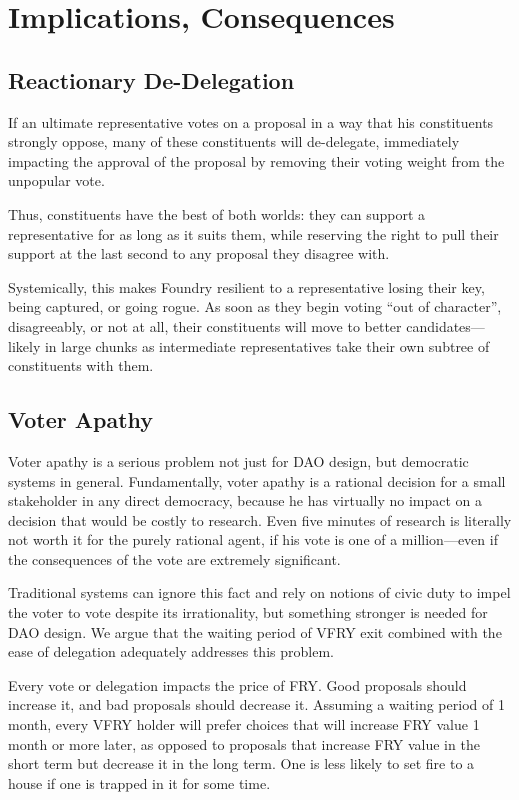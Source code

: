 \section{Implications, Consequences} \label{implications}

\subsection{Reactionary De-Delegation} \label{reactionary-dedelegation}

If an ultimate representative votes on a proposal in a way that his constituents strongly oppose, many of these constituents will de-delegate, immediately impacting the approval of the proposal by removing their voting weight from the unpopular vote.

Thus, constituents have the best of both worlds: they can support a representative for as long as it suits them, while reserving the right to pull their support at the last second to any proposal they disagree with.

Systemically, this makes Foundry resilient to a representative losing their key, being captured, or going rogue. As soon as they begin voting ``out of character'', disagreeably, or not at all, their constituents will move to better candidates---likely in large chunks as intermediate representatives take their own subtree of constituents with them.

\subsection{Voter Apathy} \label{voter-apathy}

Voter apathy is a serious problem not just for DAO design, but democratic systems in general. Fundamentally, voter apathy is a rational decision for a small stakeholder in any direct democracy, because he has virtually no impact on a decision that would be costly to research. Even five minutes of research is literally not worth it for the purely rational agent, if his vote is one of a million---even if the consequences of the vote are extremely significant.

Traditional systems can ignore this fact and rely on notions of civic duty to impel the voter to vote despite its irrationality, but something stronger is needed for DAO design. We argue that the waiting period of VFRY exit combined with the ease of delegation adequately addresses this problem.

Every vote or delegation impacts the price of FRY. Good proposals should increase it, and bad proposals should decrease it. Assuming a waiting period of 1 month, every VFRY holder will prefer choices that will increase FRY value 1 month or more later, as opposed to proposals that increase FRY value in the short term but decrease it in the long term. One is less likely to set fire to a house if one is trapped in it for some time.

